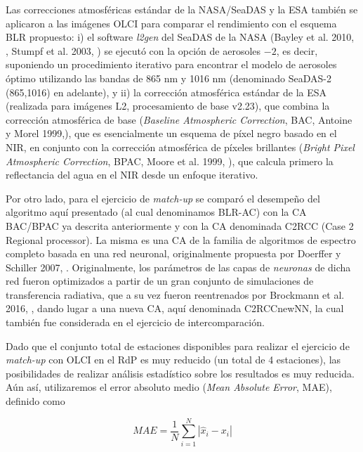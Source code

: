         Las correcciones atmosféricas estándar de la NASA/SeaDAS y la ESA también se aplicaron a las imágenes OLCI para comparar el rendimiento con el esquema BLR propuesto: i) el software \textit{l2gen} del SeaDAS de la NASA (Bayley et al. 2010, \cite{bailey2010}, Stumpf et al. 2003, \cite{stumpf2003}) se ejecutó con la opción de aerosoles $-2$, es decir, suponiendo un procedimiento iterativo para encontrar el modelo de aerosoles óptimo utilizando las bandas de 865 nm y 1016 nm (denominado SeaDAS-2 (865,1016) en adelante), y ii) la corrección atmosférica estándar de la ESA (realizada para imágenes L2, procesamiento de base v2.23), que combina la corrección atmosférica de base (\textit{Baseline Atmospheric Correction}, BAC, Antoine y Morel 1999,\cite{antoine1999}), que es esencialmente un esquema de píxel negro basado en el NIR, en conjunto con la corrección atmosférica de píxeles brillantes (\textit{Bright Pixel Atmospheric Correction}, BPAC, Moore et al. 1999, \cite{moore1999}), que calcula primero la reflectancia del agua en el NIR desde un enfoque iterativo.

        Por otro lado, para el ejercicio de \textit{match-up} se comparó el desempeño del algoritmo aquí presentado (al cual denominamos BLR-AC) con la CA BAC/BPAC ya descrita anteriormente y con la CA denominada C2RCC (Case 2 Regional processor). La misma es una CA de la familia de algoritmos de espectro completo basada en una red neuronal, originalmente propuesta por Doerffer y Schiller 2007, \cite{doerffer2007}. Originalmente, los parámetros de las capas de \textit{neuronas} de dicha red fueron optimizados a partir de un gran conjunto de simulaciones de transferencia radiativa, que a su vez fueron reentrenados por Brockmann et al. 2016, \cite{brockmann2016}, dando lugar a una nueva CA, aquí denominada C2RCCnewNN, la cual también fue considerada en el ejercicio de intercomparación.
        
        Dado que el conjunto total de estaciones disponibles para realizar el ejercicio de \textit{match-up} con OLCI en el RdP es muy reducido (un total de 4 estaciones), las posibilidades de realizar análisis estadístico sobre los resultados es muy reducida. Aún así, utilizaremos el error absoluto medio (\textit{Mean Absolute Error}, MAE), definido como 

        \begin{equation}
            MAE = \frac{1}{N}\sum_{i=1}^{N} |\hat{x}_{i}-x_{i}|
            \label{blr:eq:MAE}
        \end{equation}

